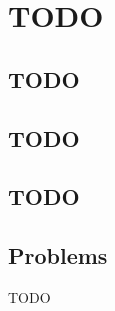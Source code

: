 \chapter{TODO}
\section{TODO}
\section{TODO}
\section{TODO}

\section{Problems}

\begin{exercise}
  TODO
\end{exercise}



